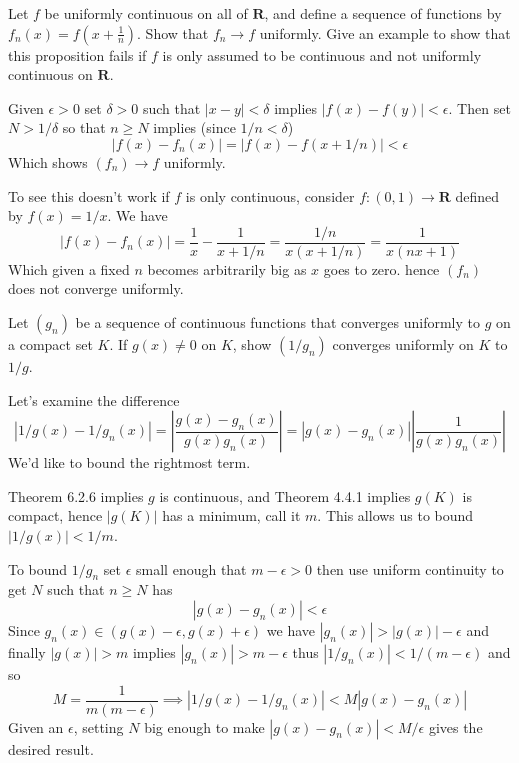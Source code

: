 \begin{exercise}
  Let $f$ be uniformly continuous on all of $\mathbf{R}$, and define a sequence of functions by $f_{n}(x)=f\left(x+\frac{1}{n}\right)$. Show that $f_{n} \rightarrow f$ uniformly. Give an example to show that this proposition fails if $f$ is only assumed to be continuous and not uniformly continuous on $\mathbf{R}$.

\end{exercise}
\begin{solution}
  Given $\epsilon>0$ set $\delta>0$ such that $|x-y|<\delta$ implies $|f(x)-f(y)|<\epsilon$.
  Then set $N > 1/\delta$ so that $n \ge N$ implies (since $1/n<\delta$)
  $$
  |f(x) - f_n(x)| = |f(x) - f(x+1/n)| < \epsilon
  $$
  Which shows $(f_n) \to f$ uniformly.

  To see this doesn't work if $f$ is only continuous, consider $f : (0,1)\to\mathbf{R}$ defined by $f(x) = 1/x$.
  We have
  $$
  |f(x)-f_n(x)| = \frac{1}{x} - \frac{1}{x+1/n} = \frac{1/n}{x(x+1/n)} = \frac{1}{x(nx+1)}
  $$
  Which given a fixed $n$ becomes arbitrarily big as $x$ goes to zero. hence $(f_n)$ does not converge uniformly.
\end{solution}
\begin{exercise}
  Let $\left(g_{n}\right)$ be a sequence of continuous functions that converges uniformly to $g$ on a compact set $K$. If $g(x) \neq 0$ on $K$, show $\left(1 / g_{n}\right)$ converges uniformly on $K$ to $1 / g$.

\end{exercise}
\begin{solution}
  Let's examine the difference
  $$
  |1/g(x) - 1/g_n(x)|
  = \left|\frac{g(x)-g_n(x)}{g(x)g_n(x)}\right|
  = \left|g(x)-g_n(x)\right|\left|\frac{1}{g(x)g_n(x)}\right| 
  $$
  We'd like to bound the rightmost term.

  Theorem 6.2.6 implies $g$ is continuous, and Theorem 4.4.1 implies $g(K)$ is compact, hence $|g(K)|$ has a minimum, call it $m$. This allows us to bound $|1/g(x)| < 1/m$.

  To bound $1/g_n$ set $\epsilon$ small enough that $m-\epsilon>0$ then use uniform continuity to get $N$ such that $n \ge N$ has
  $$
  |g(x) - g_n(x)| < \epsilon
  $$
  Since $g_n(x) \in (g(x)-\epsilon, g(x)+\epsilon)$ we have $|g_n(x)| > |g(x)|-\epsilon$ and finally $|g(x)|>m$ implies $|g_n(x)|>m-\epsilon$ thus $|1/g_n(x)| < 1/(m-\epsilon)$ and so
  $$
  M = \frac{1}{m(m-\epsilon)} \implies |1/g(x) - 1/g_n(x)| < M|g(x)-g_n(x)|
  $$
  Given an $\epsilon$, setting $N$ big enough to make $|g(x)-g_n(x)| < M/\epsilon$ gives the desired result.
\end{solution}

